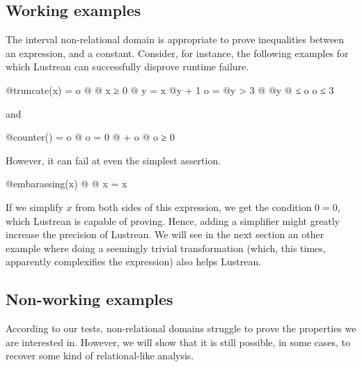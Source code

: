 \documentclass{scrartcl}
\begin{document}
\subsection{Working examples}
The interval non-relational domain is appropriate to prove inequalities between an expression,
and a constant.  Consider, for instance, the following examples for which Lustrean can
successfully disprove runtime failure.
\begin{lustre}
@\Node@ truncate(x) = o @\Where@
  @\Guard@
    x ≥ 0
  @\Where@
    y = x @\Fby@ y + 1
    o = @\If@ y > 3 @ @\Else@ y
  @ ≤ o
    o ≤ 3
\end{lustre}
and
\begin{lustre}
@\Node@ counter() = o @\Where@
  o = 0 @ + o
@\Assert@
  o ≥ 0
\end{lustre}
However, it can fail at even the simplest assertion.
\begin{lustre}
@\Node@ embarassing(x) @\Where@
@\Assert@
  x = x
\end{lustre}
If we simplify \(x\) from both sides of this expression, we get the condition \(0 = 0\), which
Lustrean is capable of proving.  Hence, adding a simplifier might greatly increase the precision
of Lustrean.  We will see in the next section an other example where doing a seemingly trivial
transformation (which, this times, apparently complexifies the expression) also helps Lustrean.

\subsection{Non-working examples}
According to our tests, non-relational domains struggle to prove the properties we are interested
in.  However, we will show that it is still possible, in some cases, to recover some kind of
relational-like analysis.
\end{document}
